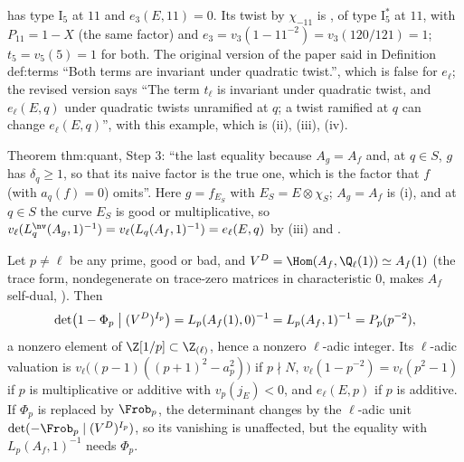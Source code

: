 \begin{example}\label{ex:lfunctions:twist-11}
 has type $\mathrm I_5$ at $11$ and $e_3(E,11)=0$. Its twist by $\chi_{-11}$ is , of type $\mathrm I_5^*$ at $11$, with $P_{11}=1-X$ (the same factor) and
$e_3=v_3(1-11^{-2})=v_3(120/121)=1$; $t_5=v_5(5)=1$ for both. The original version of the paper said in Definition def:terms ``Both terms are invariant under
quadratic twist.'', which is false for $e_\ell$; the revised version says ``The term $t_\ell$ is invariant under quadratic twist, and $e_\ell(E,q)$ under quadratic twists
unramified at $q$; a twist ramified at $q$ can change $e_\ell(E,q)$'', with this example, which is (ii), (iii), (iv).
\end{example}

\begin{paperlink}
Theorem thm:quant, Step 3: ``the last equality because $A_g=A_f$ and, at $q\in S$, $g$ has $\delta_q\ge1$, so that its naive factor is the true one, which is the factor that
$f$ (with $a_q(f)=0$) omits''. Here $g=f_{E_S}$ with $E_S=E\otimes\chi_S$; $A_g=A_f$ is (i), and at $q\in S$ the curve $E_S$ is good or multiplicative, so
$v_\ell(L_q^{\nv}(A_g,1)^{-1})=v_\ell(L_q(A_f,1)^{-1})=e_\ell(E,q)$ by (iii) and .
\end{paperlink}

\begin{proposition}\label{prop:lfunctions:fpr-L-part}
Let $p\ne\ell$ be any prime, good or bad, and $V^D=\Hom(A_f,\Q_\ell(1))\simeq A_f(1)$ (the trace form, nondegenerate on trace-zero matrices in characteristic $0$, makes $A_f$
self-dual, ). Then
\[
\det\bigl(1-\Phi_p\bigm|(V^D)^{I_p}\bigr)=L_p(A_f(1),0)^{-1}=L_p(A_f,1)^{-1}=P_p(p^{-2}),
\]
a nonzero element of $\Z[1/p]\subset\Z_{(\ell)}$, hence a nonzero $\ell$-adic integer. Its $\ell$-adic valuation is $v_\ell\bigl((p-1)((p+1)^2-a_p^2)\bigr)$ if $p\nmid N$,
$v_\ell(1-p^{-2})=v_\ell(p^2-1)$ if $p$ is multiplicative or additive with $v_p(j_E)<0$, and $e_\ell(E,p)$ if $p$ is additive. If $\Phi_p$ is
replaced by $\Frob_p$, the determinant changes by the $\ell$-adic unit $\det(-\Frob_p\mid(V^D)^{I_p})$, so its vanishing is unaffected, but the equality with $L_p(A_f,1)^{-1}$ needs
$\Phi_p$.
\end{proposition}

